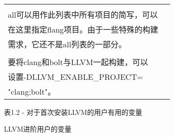 \begin{longtable}{|l|l|}
\begin{tabular}[c]{@{}l@{}}
\\all可以用作此列表中所有项目的简写，可以\\ 在这里指定flang项目。由于一些特殊的构建\\ 需求，它还不是all列表的一部分。\\
\\
要将clang和bolt与LLVM一起构建，可以\\ 设置-DLLVM\_ENABLE\_PROJECT=\\ "clang;bolt"。
\end{tabular} \\ \hline
\end{longtable}

\begin{center}
表1.2 - 对于首次安装LLVM的用户有用的变量
\end{center}

LLVM进阶用户的变量

